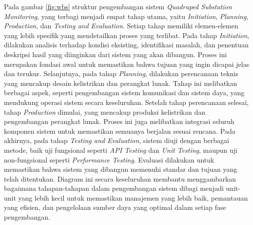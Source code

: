Pada gambar \ref{fig:wbs} struktur pengembangan sistem \emph{Quadruped Substation Monitoring}, yang terbagi menjadi empat tahap utama, yaitu \emph{Initiation}, \emph{Planning}, \emph{Production}, dan \emph{Testing and Evaluation}. Setiap tahap memiliki elemen-elemen yang lebih spesifik yang mendetailkan proses yang terlibat. Pada tahap \emph{Initiation}, dilakukan analisis terhadap kondisi eksisting, identifikasi masalah, dan penentuan deskripsi hasil yang diinginkan dari sistem yang akan dibangun. Proses ini merupakan fondasi awal untuk memastikan bahwa tujuan yang ingin dicapai jelas dan terukur. Selanjutnya, pada tahap \emph{Planning}, dilakukan perencanaan teknis yang mencakup desain kelistrikan dan perangkat lunak. Tahap ini melibatkan berbagai aspek, seperti pengembangan sistem komunikasi dan sistem daya, yang mendukung operasi sistem secara keseluruhan. Setelah tahap perencanaan selesai, tahap \emph{Production} dimulai, yang mencakup produksi kelistrikan dan pengembangan perangkat lunak. Proses ini juga melibatkan integrasi seluruh komponen sistem untuk memastikan semuanya berjalan sesuai rencana. Pada akhirnya, pada tahap \emph{Testing and Evaluation}, sistem diuji dengan berbagai metode, baik uji fungsional seperti \emph{API Testing} dan \emph{Unit Testing}, maupun uji non-fungsional seperti \emph{Performance Testing}. Evaluasi dilakukan untuk memastikan bahwa sistem yang dibangun memenuhi standar dan tujuan yang telah ditentukan. Diagram ini secara keseluruhan membantu menggambarkan bagaimana tahapan-tahapan dalam pengembangan sistem dibagi menjadi unit-unit yang lebih kecil untuk memastikan manajemen yang lebih baik, pemantauan yang efisien, dan pengelolaan sumber daya yang optimal dalam setiap fase pengembangan.


